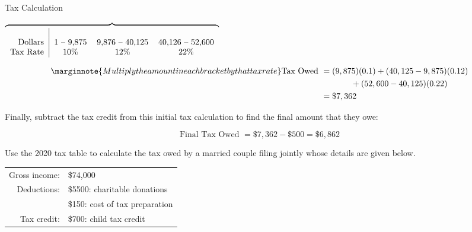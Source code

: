 \begin{example}[https://www.youtube.com/watch?v=ls2UbXuadrw&list=PLfmpjsIzhztsZtnb7HnXrQ8SLoiOCIcAM&index=45]{Tax Calculation}
\begin{center}
$\overbrace{
\begin{tabular}{r | c c c}
& & & \\
Dollars & 1 -- 9,875 & 9,876 -- 40,125 & 40,126 -- 52,600\\
Tax Rate & 10\% & 12\% & 22\%\\
\end{tabular}
}$
\end{center}
\begin{align*}\marginnote{Multiply the amount in each bracket by that tax rate}
\textrm{Tax Owed } &= (9,875)(0.1) + (40,125-9,875)(0.12)\\ &\hspace{0.5in} + (52,600-40,125)(0.22)\\ &= \$7,362
\end{align*}

Finally, subtract the tax credit from this initial tax calculation to find the final amount that they owe:

\[\textrm{Final Tax Owed } = \$7,362 - \$500 = \boxed{\$6,862}\]
\end{example}

\begin{try}
Use the 2020 tax table to calculate the tax owed by a married couple filing jointly whose details are given below.
\begin{center}
\begin{tabular}{r l}
Gross income: & \$74,000\\
Deductions: & \$5500: charitable donations\\
& \$150: cost of tax preparation\\
Tax credit: & \$700: child tax credit
\end{tabular}
\end{center}
\end{try}

